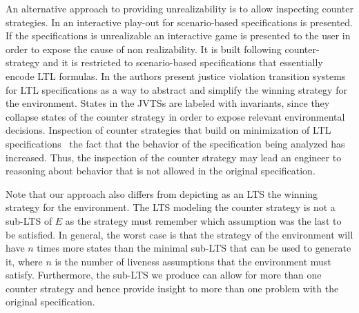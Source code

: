 An alternative approach to providing unrealizability is to allow inspecting counter strategies. 
 In \cite{DBLP:conf/emsoft/CernyGHRT12} an interactive play-out for scenario-based specifications is presented.  If the specifications is unrealizable an interactive game is presented to the user in order to expose the cause of non realizability.  It is built following \cite{DBLP:conf/hvc/KonighoferHB10} counter-strategy and it is restricted to scenario-based specifications that essentially encode LTL formulas.
 In \cite{DBLP:conf/sigsoft/KuventMR17} the authors present
 justice violation transition systems for LTL specifications as a way to abstract
 and simplify the winning strategy for the environment.
 States in the JVTSs are labeled with invariants, since
 they  collapse states of the counter strategy
 in order to expose relevant environmental decisions.
Inspection of counter strategies that build on minimization of LTL specifications~\cite{DBLP:conf/emsoft/CernyGHRT12,DBLP:conf/sigsoft/KuventMR17} the fact that the behavior of the specification being analyzed has increased. Thus, the inspection of the counter strategy may lead an engineer to reasoning about behavior that is not allowed in the original specification.   

 Note that our approach also differs from depicting as an LTS the winning strategy for the environment. The LTS modeling the counter strategy is not a sub-LTS of $E$ as the strategy must remember which assumption was the last to be satisfied. In general, the worst case is that the strategy of the environment will have $n$ times more states than the minimal sub-LTS that can be used to generate it, where $n$ is the number of liveness assumptions that the environment must satisfy. Furthermore, the sub-LTS we produce can allow for more than one counter strategy and hence provide insight to more than one problem with the original specification. 
 



